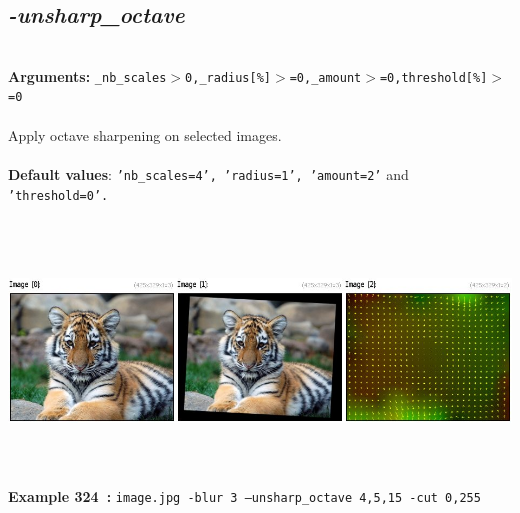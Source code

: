 \documentclass[a4paper,11pt,twoside]{book}
\begin{document}
\subsection{\emph{-unsharp\_octave} }\vspace*{-0.5em}
~\\\textbf{Arguments: } 
{\small \texttt{\_nb\_scales$>$0,\_radius[\%]$>$=0,\_amount$>$=0,threshold[\%]$>$=0}}\\~\\
Apply octave sharpening on selected images.
~\\~\\\textbf{Default values}: {\small \texttt{'nb\_scales=4', 'radius=1', 'amount=2'} and \texttt{'threshold=0'.}}
\begin{center}\includegraphics[keepaspectratio=true,height=7cm,width=\textwidth]{img/gmic_def324.jpg}\\
{\footnotesize \textbf{Example 324~:} \texttt{image.jpg -blur 3 --unsharp\_octave 4,5,15 -cut 0,255}}
\end{center}
\end{document}
